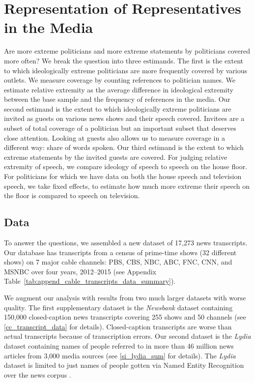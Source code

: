 \documentclass[12pt, letterpaper]{article}
\begin{document}
\section*{Representation of Representatives in the Media}
Are more extreme politicians and more extreme statements by politicians covered more often?  We break the question into three estimands. The first is the extent to which ideologically extreme politicians are more frequently covered by various outlets. We measure coverage by counting references to politician names. We estimate relative extremity as the average difference in ideological extremity between the base sample and the frequency of references in the media. Our second estimand is the extent to which ideologically extreme politicians are invited as guests on various news shows and their speech covered. Invitees are a subset of total coverage of a politician but an important subset that deserves close attention. Looking at guests also allows us to measure coverage in a different way: share of words spoken. Our third estimand is the extent to which extreme statements by the invited guests are covered. For judging relative extremity of speech, we compare ideology of speech to speech on the house floor. For politicians for which we have data on both the house speech and television speech, we take fixed effects, to estimate how much more extreme their speech on the floor is compared to speech on television.

\subsection*{Data}
To answer the questions, we assembled a new dataset of 17,273 news transcripts. Our database has transcripts from a census of prime-time shows (32 different shows) on 7 major cable channels: PBS, CBS, NBC, ABC, FNC, CNN, and MSNBC over four years, 2012--2015 (see Appendix Table~\ref{tab:append_cable_transcripts_data_summary}).

We augment our analysis with results from two much larger datasets with worse quality. The first supplementary dataset is the \textit{Newsbank} dataset containing 150,000 closed-caption news transcripts covering 255 shows and 50 channels (see \ref{cc_transcript_data} for details). Closed-caption transcripts are worse than actual transcripts because of transcription errors. Our second dataset is the \textit{Lydia} dataset containing names of people referred to in more than 46 million news articles from 3,000 media sources (see \ref{si_lydia_sum} for details). The \textit{Lydia} dataset is limited to just names of people gotten via Named Entity Recognition over the news corpus \citep{lloyd2005lydia}.
\end{document}
